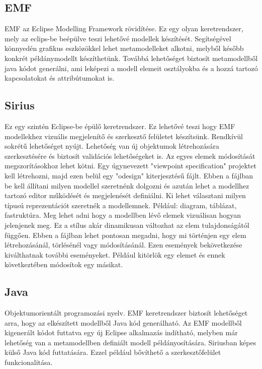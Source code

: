 \subsection{EMF}
EMF az Eclipse Modelling Framework rövidítése. Ez egy olyan keretrendszer, mely az eclips-be beépülve teszi lehetővé modellek készítését. Segítségével könnyedén grafikus eszközökkel lehet metamodelleket alkotni, melyből később konkrét példánymodellt készíthetünk. Továbbá lehetőséget biztosít metamodellből java kódot generálni, ami leképezi a modell elemeit osztályokba és a hozzá tartozó kapcsolatokat és attribútumokat is.

\subsection{Sirius}
Ez egy szintén Eclipse-be épülő keretrendszer. Ez lehetővé teszi hogy EMF modellekhez vizuális megjelenítő és szerkesztő felületet készítsünk. Rendkívül sokrétű lehetőséget nyújt. Lehetőség van új objektumok létrehozására szerkesztésére és biztosít validációs lehetőségeket is. Az egyes elemek módosítását megszorításokhoz lehet kötni. Egy úgynevezett "viewpoint specification" projektet kell létrehozni, majd ezen belül egy "odesign" kiterjesztésű fájlt. Ebben a fájlban be kell állítani milyen modellel szeretnénk dolgozni és azután lehet a modellhez tartozó editor működését és megjelenését definiálni. Ki lehet választani milyen típusú reprezentációt szeretnék a modellemnek. Például: diagram, táblázat, fastruktúra. Meg lehet adni hogy a modellben lévő elemek vizuálisan hogyan jelenjenek meg. Ez a stílus akár dinamikusan változhat az elem tulajdonságától függően. Ebben a fájlban lehet pontosan megadni, hogy mi történjen egy elem létrehozásánál, törlésénél vagy módosításánál. Ezen események bekövetkezése kiválthatnak további eseményeket. Például kitörlök egy elemet és ennek következtében módosítok egy másikat.

\subsection{Java}
Objektumorientált programozási nyelv. EMF keretrendszer biztosít lehetőséget arra, hogy az elkészített modellből Java kód generálható. Az EMF modellből kigenerált kódot futtatva egy új Eclipse alkalmazás indítható, melyben már lehetőség van a metamodellben definiált modell példányosítására. Siriusban képes külső Java kód futtatására. Ezzel például bővíthető a szerkesztőfelület funkcionalitása.

